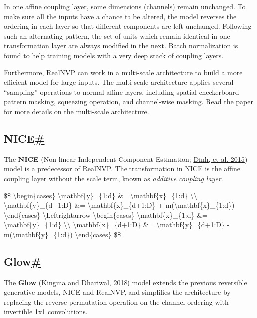 In one affine coupling layer, some dimensions (channels) remain unchanged. To make sure all the inputs have a chance to be altered, the model reverses the ordering in each layer so that different components are left unchanged. Following such an alternating pattern, the set of units which remain identical in one transformation layer are always modified in the next. Batch normalization is found to help training models with a very deep stack of coupling layers.

Furthermore, RealNVP can work in a multi-scale architecture to build a more efficient model for large inputs. The multi-scale architecture applies several ``sampling'' operations to normal affine layers, including spatial checkerboard pattern masking, squeezing operation, and channel-wise masking. Read the \href{https://arxiv.org/abs/1605.08803}{paper} for more details on the multi-scale architecture.

\subsection{\texorpdfstring{NICE\hyperref[nice]{\#}}{NICE\#}}\label{nice}

The \textbf{NICE} (Non-linear Independent Component Estimation; \href{https://arxiv.org/abs/1410.8516}{Dinh, et al. 2015}) model is a predecessor of \hyperref[realnvp]{RealNVP}. The transformation in NICE is the affine coupling layer without the scale term, known as \emph{additive coupling layer}.

\$\$ \textbackslash begin\{cases\} \textbackslash mathbf\{y\}\_\{1:d\} \&= \textbackslash mathbf\{x\}\_\{1:d\} \textbackslash\textbackslash{} \textbackslash mathbf\{y\}\_\{d+1:D\} \&= \textbackslash mathbf\{x\}\_\{d+1:D\} + m(\textbackslash mathbf\{x\}\_\{1:d\}) \textbackslash end\{cases\} \textbackslash Leftrightarrow \textbackslash begin\{cases\} \textbackslash mathbf\{x\}\_\{1:d\} \&= \textbackslash mathbf\{y\}\_\{1:d\} \textbackslash\textbackslash{} \textbackslash mathbf\{x\}\_\{d+1:D\} \&= \textbackslash mathbf\{y\}\_\{d+1:D\} - m(\textbackslash mathbf\{y\}\_\{1:d\}) \textbackslash end\{cases\} \$\$

\subsection{\texorpdfstring{Glow\hyperref[glow]{\#}}{Glow\#}}\label{glow}

The \textbf{Glow} (\href{https://arxiv.org/abs/1807.03039}{Kingma and Dhariwal, 2018}) model extends the previous reversible generative models, NICE and RealNVP, and simplifies the architecture by replacing the reverse permutation operation on the channel ordering with invertible 1x1 convolutions.

